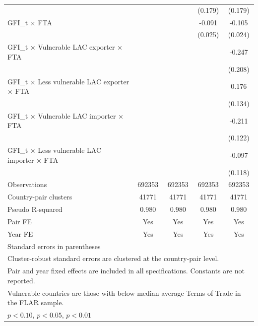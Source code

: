 \begin{table}[htbp]
\begin{tabular}{l*{4}{c}}
          &                  &                  &  (0.179)         &  (0.179)         \\
[1em]
GFI\_t × FTA&                  &                  &   -0.091\sym{***}&   -0.105\sym{***}\\
          &                  &                  &  (0.025)         &  (0.024)         \\
[1em]
GFI\_t × Vulnerable LAC exporter × FTA&                  &                  &                  &   -0.247         \\
          &                  &                  &                  &  (0.208)         \\
[1em]
GFI\_t × Less vulnerable LAC exporter × FTA&                  &                  &                  &    0.176         \\
          &                  &                  &                  &  (0.134)         \\
[1em]
GFI\_t × Vulnerable LAC importer × FTA&                  &                  &                  &   -0.211\sym{*}  \\
          &                  &                  &                  &  (0.122)         \\
[1em]
GFI\_t × Less vulnerable LAC importer × FTA&                  &                  &                  &   -0.097         \\
          &                  &                  &                  &  (0.118)         \\
\hline
Observations&   692353         &   692353         &   692353         &   692353         \\
Country-pair clusters&    41771         &    41771         &    41771         &    41771         \\
Pseudo R-squared&    0.980         &    0.980         &    0.980         &    0.980         \\
Pair FE   &      Yes         &      Yes         &      Yes         &      Yes         \\
Year FE   &      Yes         &      Yes         &      Yes         &      Yes         \\
\hline\hline
\multicolumn{5}{l}{\footnotesize Standard errors in parentheses}\\
\multicolumn{5}{l}{\footnotesize Cluster-robust standard errors are clustered at the country-pair level.}\\
\multicolumn{5}{l}{\footnotesize Pair and year fixed effects are included in all specifications. Constants are not reported.}\\
\multicolumn{5}{l}{\footnotesize Vulnerable countries are those with below-median average Terms of Trade in the FLAR sample.}\\
\multicolumn{5}{l}{\footnotesize \sym{*} \(p<0.10\), \sym{**} \(p<0.05\), \sym{***} \(p<0.01\)}\\
\end{tabular}
\end{table}
